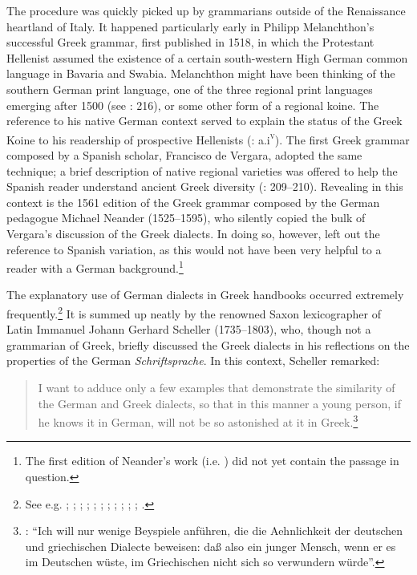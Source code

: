 The procedure was quickly picked up by grammarians outside of the Renaissance heartland of Italy. It happened particularly early in Philipp Melanchthon’s successful Greek grammar, first published in 1518, in which the Protestant Hellenist assumed the existence of a certain south-western High German common language in Bavaria and Swabia. Melanchthon might have been thinking of the southern German print language, one of the three regional print languages emerging after 1500 (see \citealt{Mattheier2003}: 216), or some other form of a regional koine. The reference to his native German context served to explain the status of the Greek Koine to his readership of prospective Hellenists (\citealt{Melanchthon1518}: a.i\textsc{\textsuperscript{v}}). The first Greek grammar composed by a Spanish scholar, Francisco de Vergara, adopted the same technique; a brief description of native regional varieties was offered to help the Spanish reader understand ancient Greek diversity (\citealt{Vergara1537}: 209–210). Revealing in this context is the 1561 edition of the Greek grammar composed by the German pedagogue Michael Neander (1525–1595), who silently copied the bulk of Vergara’s discussion of the Greek dialects. In doing so, however, \citet[340--343]{Neander1561} left out the reference to Spanish variation, as this would not have been very helpful to a reader with a German background.\footnote{The first edition of Neander’s work (i.e. \citealt{Neander1553}) did not yet contain the passage in question.}

The explanatory use of German dialects in Greek handbooks occurred extremely frequently.\footnote{See e.g. \citet[3--4]{Schmidt1604}; \citet[83]{Rhenius1626}; \citet[\textsc{b.4}\textsc{\textsuperscript{r}}]{Schorling1678}; \citet[\textsc{b.2}\textsc{\textsuperscript{v}}]{KirchmaierCrusius1684}; \citet[376]{Kober1701}; \citet[\textsc{c.2}\textsc{\textsuperscript{v}}]{Thryllitsch1709}; \citet[b.2\textsc{\textsuperscript{v}}\textsc{–}b.3\textsc{\textsuperscript{r}}]{Nibbe1725}; \citet[141]{Georgi1733}; \citet[13]{Schuster1737}; \citet[207--209]{Simonis1752}; \citet[191--192]{Peternader1776}; \citet[\textsc{xxvi}]{Harles1778}.} It is summed up neatly by the renowned Saxon lexicographer of Latin Immanuel Johann Gerhard Scheller (1735–1803), who, though not a grammarian of Greek, briefly discussed the Greek dialects in his reflections on the properties of the German \textit{Schriftsprache}. In this context, Scheller remarked:

\begin{quote}
I want to adduce only a few examples that demonstrate the similarity of the German and Greek dialects, so that in this manner a young person, if he knows it in German, will not be so astonished at it in Greek.\footnote{\citet[229]{Scheller1772}: “Ich will nur wenige Beyspiele anführen, die die Aehnlichkeit der deutschen und griechischen Dialecte beweisen: daß also ein junger Mensch, wenn er es im Deutschen wüste, im Griechischen nicht sich so verwundern würde”.}
\end{quote}

